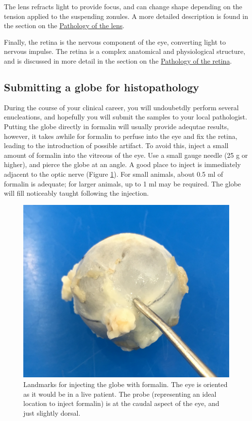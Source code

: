 \documentclass[openany]{article}
\begin{document}
The lens refracts light to provide focus, and can change shape depending
on the tension applied to the suspending zonules. A more detailed
description is found in the section on the
\protect\hyperlink{pathology-of-the-lens}{Pathology of the lens}.

Finally, the retina is the nervous component of the eye, converting
light to nervous impulse. The retina is a complex anatomical and
physiological structure, and is discussed in more detail in the section
on the \protect\hyperlink{pathology-of-the-retina}{Pathology of the
retina}.

\subsection{Submitting a globe for
histopathology}\label{submitting-a-globe-for-histopathology}

During the course of your clinical career, you will undoubetdly perform
several enucleations, and hopefully you will submit the samples to your
local pathologist. Putting the globe directly in formalin will usually
provide adequtae results, however, it takes awhile for formalin to
perfuse into the eye and fix the retina, leading to the introduction of
possible artifact. To avoid this, inject a small amount of formalin into
the vitreous of the eye. Use a small gauge needle (25 g or higher), and
pierce the globe at an angle. A good place to inject is immediately
adjacent to the optic nerve (Figure \ref{fig:globe-biopsy}). For small
animals, about 0.5 ml of formalin is adequate; for larger animals, up to
1 ml may be required. The globe will fill noticeably taught following
the injection.

\begin{figure}

{\centering \includegraphics[width=0.6\linewidth]{images/globe-biopsy} 

}

\caption{Landmarks for injecting the globe with formalin. The eye is oriented as it would be in a live patient. The probe (representing an ideal location to inject formalin) is at the caudal aspect of the eye, and just slightly dorsal.}\label{fig:globe-biopsy}
\end{figure}
\end{document}
